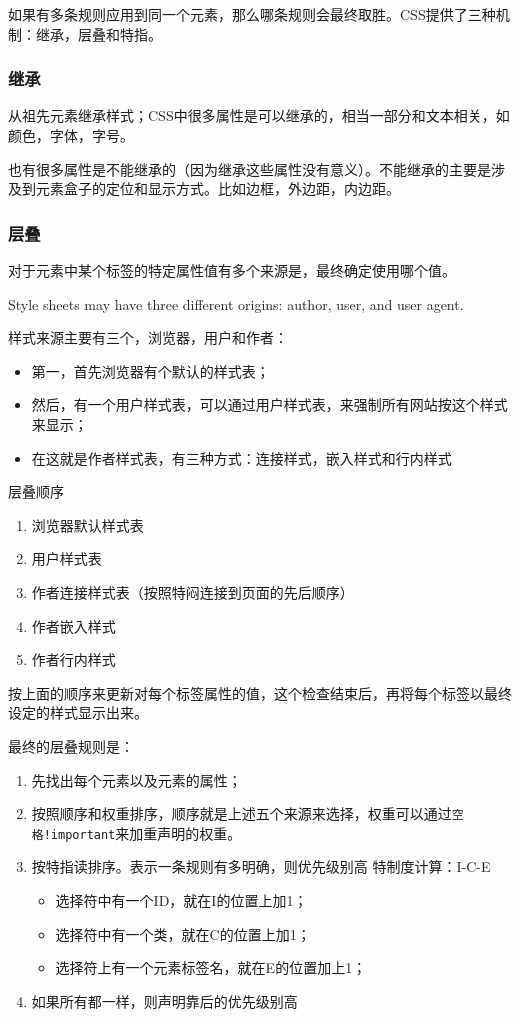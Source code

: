 如果有多条规则应用到同一个元素，那么哪条规则会最终取胜。CSS提供了三种机制：继承，层叠和特指。


\subsubsection{继承}

从祖先元素继承样式；CSS中很多属性是可以继承的，相当一部分和文本相关，如颜色，字体，字号。

也有很多属性是不能继承的（因为继承这些属性没有意义）。不能继承的主要是涉及到元素盒子的定位和显示方式。比如边框，外边距，内边距。

\subsubsection{层叠}

对于元素中某个标签的特定属性值有多个来源是，最终确定使用哪个值。

Style sheets may have three different origins: author, user, and user agent.

样式来源主要有三个，浏览器，用户和作者：
\begin{itemize}
\item 第一，首先浏览器有个默认的样式表；
\item 然后，有一个用户样式表，可以通过用户样式表，来强制所有网站按这个样式来显示；
\item 在这就是作者样式表，有三种方式：连接样式，嵌入样式和行内样式
\end{itemize}

层叠顺序
\begin{enumerate}
\item 浏览器默认样式表
\item 用户样式表
\item 作者连接样式表（按照特闷连接到页面的先后顺序）
\item 作者嵌入样式
\item 作者行内样式
\end{enumerate}

按上面的顺序来更新对每个标签属性的值，这个检查结束后，再将每个标签以最终设定的样式显示出来。


最终的层叠规则是：
\begin{enumerate}
\item 先找出每个元素以及元素的属性；
\item 按照顺序和权重排序，顺序就是上述五个来源来选择，权重可以通过\lstinline$空格!important$来加重声明的权重。
\item 按特指读排序。表示一条规则有多明确，则优先级别高
特制度计算：I-C-E
\begin{itemize}
\item 选择符中有一个ID，就在I的位置上加1；
\item 选择符中有一个类，就在C的位置上加1；
\item 选择符上有一个元素标签名，就在E的位置加上1；
\end{itemize}
\item 如果所有都一样，则声明靠后的优先级别高
\end{enumerate}


